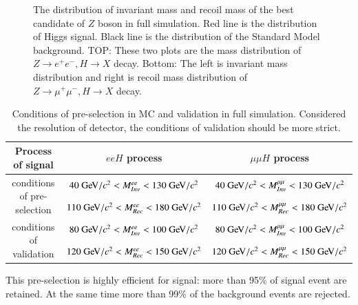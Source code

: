 \documentclass[11pt,a4paper]{cepcnote}
\begin{document}
\begin{figure}[H]
{		\label{fig:uuHfilteredRecMass}
	}
	\caption[]{The distribution of invariant mass and recoil mass of the best candidate of $Z$ boson in full simulation. 
	Red line is the distribution of Higgs signal. Black line is the distribution of the Standard Model background.
	TOP: These two plots are the mass distribution of $Z\rightarrow e^+e^-, H\rightarrow X$ decay.
	Bottom: The left is invariant mass distribution and right is recoil mass distribution of $Z\rightarrow \mu^+\mu^-, H\rightarrow X$ decay.}
	\label{fig:llHfiltered}
\end{figure}

\begin{table}[H]
\newcommand{\tabincell}[2]{\begin{tabular}{@{}#1@{}}#2\end{tabular}}
 \begin{center}
  \begin{tabular}{|c|c|c|}
  \hline \hline
  Process of signal				&		$eeH$ process						&				$\mu\mu H$ process\\
  \hline
  \multirow{2}{*}{conditions of pre-selection} 	&	$40\gev/c^2 < M_{Inv}^{ee} < 130\gev/c^2$&$40\gev/c^2 < M_{Inv}^{\mu\mu} < 130\gev/c^2$	\\
  											&	$110\gev/c^2 < M_{Rec}^{ee} < 180\gev/c^2$		&$110\gev/c^2 < M_{Rec}^{\mu\mu} < 180\gev/c^2$\\
  \hline
  \multirow{2}{*}{conditions of validation}	&	$80\gev/c^2 < M_{Inv}^{ee} < 100\gev/c^2$&$80\gev/c^2 < M_{Inv}^{\mu\mu} < 100\gev/c^2$	\\
  											&	$120\gev/c^2 < M_{Rec}^{ee} < 150\gev/c^2$		&$120\gev/c^2 < M_{Rec}^{\mu\mu} < 150\gev/c^2$\\
  \hline \hline
  \end{tabular}
  \caption[]{Conditions of pre-selection in MC and validation in full simulation. Considered the resolution of detector, 
  the conditions of validation should be more strict.}
  \label{tab:llhprecut}
 \end{center}
\end{table}
This pre-selection is highly efficient for signal: more than 95\% of signal event are retained. At the same time
more than 99\% of the background events are rejected. 
\end{document}
